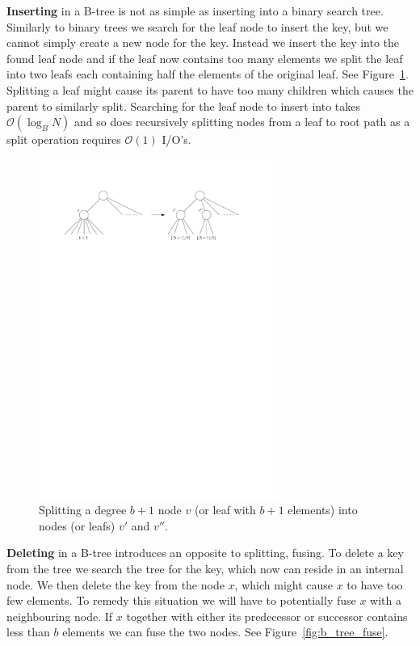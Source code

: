 \documentclass[twoside,11pt,openright]{report}
\begin{document}
\textbf{Inserting} in a B-tree is not as simple as inserting into a binary search tree. Similarly to binary trees we search for the leaf node to insert the key, but we cannot simply create a new node for the key. Instead we insert the key into the found leaf node and if the leaf now contains too many elements we split the leaf into two leafs each containing half the elements of the original leaf. See Figure~\ref{fig:b_tree_split}. Splitting a leaf might cause its parent to have too many children which causes the parent to similarly split.
Searching for the leaf node to insert into takes $\mathcal{O}(\log_B N)$ and so does recursively splitting nodes from a leaf to root path as a split operation requires $\mathcal{O}(1)$ I/O's.

\begin{figure}[H]
	\centering
	\includegraphics[width=0.7\textwidth]{../figures/b_tree_split}
	\caption{Splitting a degree $b+1$ node $v$ (or leaf with $b+1$ elements) into nodes (or leafs) $v'$ and $v''$.}
	\label{fig:b_tree_split}
\end{figure}

\textbf{Deleting} in a B-tree introduces an opposite to splitting, fusing. To delete a key from the tree we search the tree for the key, which now can reside in an internal node. We then delete the key from the node $x$, which might cause $x$ to have too few elements. To remedy this situation we will have to potentially fuse $x$ with a neighbouring node. If $x$ together with either its predecessor or successor contains less than $b$ elements we can fuse the two nodes. See Figure~\ref{fig:b_tree_fuse}.
\end{document}
